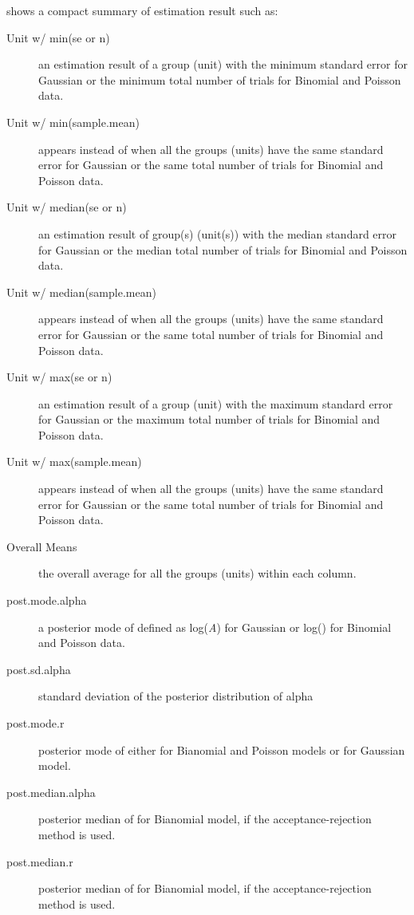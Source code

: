 \documentclass[a4paper]{book}
\begin{document}
%
\begin{Value}
 shows a compact summary of estimation result such as:
\begin{ldescription}
\item[\code{Main summary}] 
\begin{description}

\item[Unit w/ min(se or n)] an estimation result of a group (unit) with the minimum standard error for Gaussian or the minimum total number of trials for Binomial and Poisson data.
\item[Unit w/ min(sample.mean)] appears instead of  when all the groups (units) have the same standard error for Gaussian or the same total number of trials for Binomial and Poisson data.
\item[Unit w/ median(se or n)] an estimation result of group(s) (unit(s)) with the median standard error for Gaussian or the median total number of trials for Binomial and Poisson data.
\item[Unit w/ median(sample.mean)] appears instead of  when all the groups (units) have the same standard error for Gaussian or the same total number of trials for Binomial and Poisson data.
\item[Unit w/ max(se or n)] an estimation result of a group (unit) with the maximum standard error for Gaussian or the maximum total number of trials for Binomial and Poisson data.
\item[Unit w/ max(sample.mean)] appears instead of  when all the groups (units) have the same standard error for Gaussian or the same total number of trials for Binomial and Poisson data.
\item[Overall Means] the overall average for all the groups (units) within each column.

\end{description}


\item[\code{Second-level Variance Component Estimation Summary}] 
\begin{description}

\item[post.mode.alpha] a posterior mode of \eqn{\alpha}{} defined as log(\emph{A}) for Gaussian or log() for Binomial and Poisson data.
\item[post.sd.alpha] standard deviation of the posterior distribution of alpha
\item[post.mode.r] posterior mode of either  for Bianomial and Poisson models or  for Gaussian model.
\item[post.median.alpha] posterior median of \eqn{\alpha}{} for Bianomial model, if the acceptance-rejection method is used.
\item[post.median.r] posterior median of  for Bianomial model, if the acceptance-rejection method is used.


\end{description}
\end{ldescription}
\end{Value}
\end{document}
